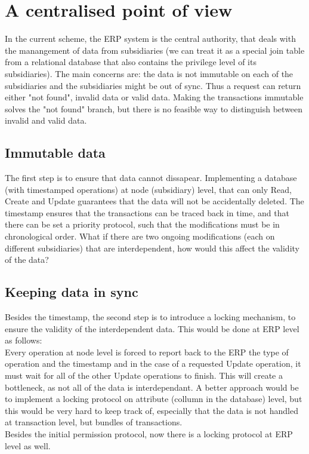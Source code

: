 \section{A centralised point of view}
In the current scheme, the ERP system is the central authority, that deals with the manangement of data from subsidiaries (we can treat it as a special join table from a relational database that also contains the privilege level of its subsidiaries). The main concerns are: the data is not immutable on each of the subsidiaries and the subsidiaries might be out of sync. Thus a request can return either "not found", invalid data or valid data. Making the transactions immutable solves the "not found" branch, but there is no feasible way to distinguish between invalid and valid data.\\

\subsection{Immutable data}
The first step is to ensure that data cannot dissapear. Implementing a database (with timestamped operations) at node (subsidiary) level, that can only Read, Create and Update guarantees that the data will not be accidentally deleted. The timestamp ensures that the transactions can be traced back in time, and that there can be set a priority protocol, such that the modifications must be in chronological order. What if there are two ongoing modifications (each on different subsidiaries) that are interdependent, how would this affect the validity of the data?
\subsection{Keeping data in sync}
Besides the timestamp, the second step is to introduce a locking mechanism, to ensure the validity of the interdependent data. This would be done at ERP level as follows:\\
Every operation at node level is forced to report back to the ERP the type of operation and the timestamp and in the case of a requested Update operation, it must wait for all of the other Update operations to finish. This will create a bottleneck, as not all of the data is interdependant. A better approach would be to implement a locking protocol on attribute (collumn in the database) level, but this would be very hard to keep track of, especially that the data is not handled at transaction level, but bundles of transactions.\\
Besides the initial permission protocol, now there is a locking protocol at ERP level as well.\\
